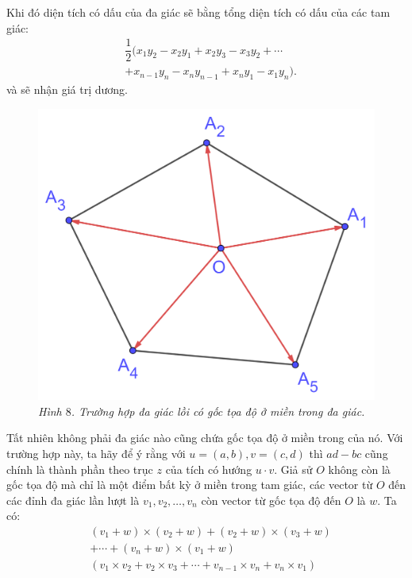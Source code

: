 \begin{multicols}{2}
	\vskip 0.1cm
	Khi đó diện tích có dấu của đa giác sẽ bằng tổng diện tích có dấu của các tam giác:
	\begin{align*}
		&\dfrac{1}{2}(x_1y_2 - x_2y_1 + x_2y_3 - x_3y_2 + \cdots \\
		&+ x_{n-1}y_n - x_ny_{n-1} + x_ny_1 - x_1y_n).
	\end{align*}
	và sẽ nhận giá trị dương.
	\begin{figure}[H]
		\vspace*{-5pt}
		\centering
		\captionsetup{labelformat= empty, justification=centering}
		\includegraphics[width= 1\linewidth]{12}
		\caption{\small\textit{\color{toanhocdoisong}Hình $8$. Trường hợp đa giác lồi có gốc tọa độ ở miền trong đa giác.}}
		\vspace*{-10pt}
	\end{figure}
	Tất nhiên không phải đa giác nào cũng chứa gốc tọa độ ở miền trong của nó. Với trường hợp này, ta hãy để ý rằng với $u=(a,b),v=(c,d)$ thì $ad-bc$ cũng chính là thành phần theo trục $z$ của tích có hướng $u\cdot v$. Giả sử $O$ không còn là gốc tọa độ mà chỉ là một điểm bất kỳ ở miền trong tam giác, các vector từ $O$ đến các đỉnh đa giác lần lượt là $v_1,v_2,\ldots,v_n$ còn vector từ gốc tọa độ đến $O$ là $w$.
	\vskip 0.1cm
	Ta có:
	\begin{align*}
		&(v_1+w) \times (v_2+w)+(v_2+w) \times (v_3+w)\\
		&+ \cdots +(v_n+w) \times (v_1+w)\\
		&(v_1 \times v_2+v_2 \times v_3+\cdots+v_{n-1} \times v_n + v_n \times v_1 )\\

\end{align*}
\end{multicols}
